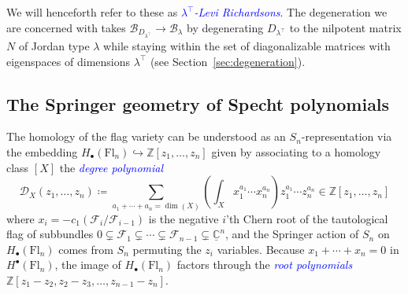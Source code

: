 \documentclass[11pt]{amsart}
\theoremstyle{definition}
\numberwithin{equation}{section}
\newcommand{\fl}[1]{\mathrm{Fl}_{#1}}
\renewcommand\emph[1]{\textcolor{blue}{\textit{#1}}} %
\begin{document}
We will henceforth refer to these as \emph{$\lambda^{\top}$-Levi Richardsons}.
The degeneration we are concerned with takes $\mathcal{B}_{D_{\lambda^{\top}}}\to \mathcal{B}_\lambda$ by degenerating $D_{\lambda^{\top}}$ to the nilpotent matrix $N$ of Jordan type $\lambda$ while staying within the set of diagonalizable matrices with eigenspaces of dimensions $\lambda^{\top}$ (see Section~\ref{sec:degeneration}).



\subsection{The Springer geometry of Specht polynomials}

The homology of the flag variety can be understood as an $S_n$-representation via the embedding $H_\bullet(\fl{n})\hookrightarrow \mathbb{Z}[z_1,\ldots,z_n]$ given by associating to a homology class $[X]$ the \emph{degree polynomial}
\begin{equation}
\label{eqn:generating}\mathcal{D}_X(z_1,\ldots,z_n)\coloneqq \sum_{a_1+\cdots+a_n=\dim(X)}\left(\int_{X}x_1^{a_1}\cdots x_n^{a_n}\right)z_1^{a_1}\cdots z_n^{a_n}\in \mathbb{Z}[z_1,\ldots,z_n]\end{equation}
where $x_i=-c_1(\mathcal{F}_i/\mathcal{F}_{i-1})$ is the negative $i$'th Chern root of the tautological flag of subbundles $0\subsetneq \mathcal{F}_1\subsetneq \cdots \subsetneq \mathcal{F}_{n-1}\subsetneq \underline{\mathbb{C}}^n$, and the Springer action of $S_n$ on $H_\bullet(\fl{n})$ comes from $S_n$ permuting the $z_i$ variables. Because $x_1+\cdots+x_n=0$ in $H^\bullet(\fl{n})$, the image of $H_\bullet(\fl{n})$ factors through the \emph{root polynomials} $\mathbb{Z}[z_1-z_2,z_2-z_3,\ldots,z_{n-1}-z_n]$.
\end{document}
